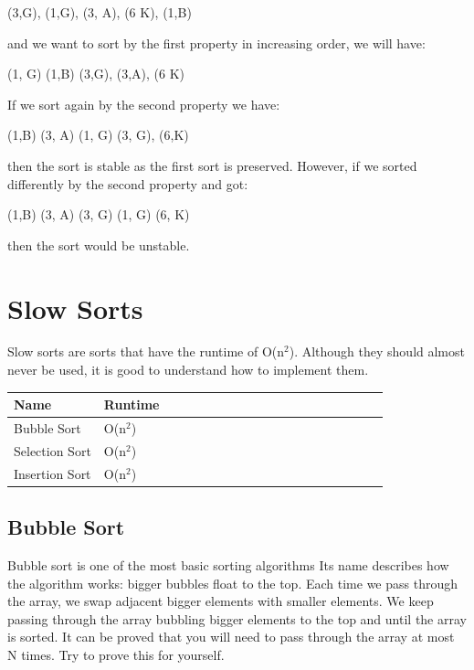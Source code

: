 \documentclass[11pt,oneside]{book}
\begin{document}
(3,G), (1,G), (3, A), (6 K), (1,B)

and we want to sort by the first property in increasing order, we will have:

(1, G) (1,B) (3,G), (3,A), (6 K)

If we sort again by the second property we have:

(1,B) (3, A) (1, G) (3, G), (6,K)

then the sort is stable as the first sort is preserved. However, if we sorted differently by the second property and got:

(1,B) (3, A) (3, G) (1, G) (6, K)

then the sort would be unstable.


    \chapter{ Slow Sorts }
        

Slow sorts are sorts that have the runtime of O(n$^{2}$). Although they should almost never be used, it is good to understand how to implement them.

\begin{center}\begin{tabulary}{0.4\linewidth}{|l|l|l|l|l|l|l|l|l|l|l|l|l|l|l|l|l|l|l}\hline


  Name &
  Runtime\\
\hline


  Bubble Sort &
  O(n$^{2}$)\\

  Selection Sort &
  O(n$^{2}$)\\

  Insertion Sort &
  O(n$^{2}$)\\

\hline\end{tabulary}\end{center}


        \section{ Bubble Sort }
        

Bubble sort is one of the most basic sorting algorithms Its name describes how the algorithm works: bigger bubbles float to the top. Each time we pass through the array, we swap adjacent bigger elements with smaller elements. We keep passing through the array bubbling bigger elements to the top and until the array is sorted. It can be proved that you will need to pass through the array at most N times. Try to prove this for yourself.
\end{document}
